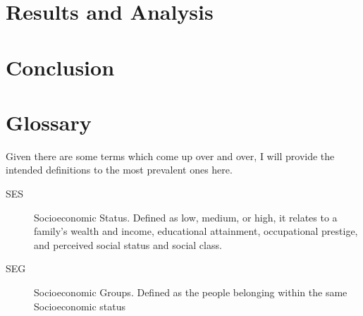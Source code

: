 \documentclass[fleqn,10pt]{olplainarticle}
\begin{document}
\section*{Results and Analysis}
\section*{Conclusion}
\section*{Glossary}
Given there are some terms which come up over and over, I will provide the intended definitions to the most prevalent ones here.

\begin{description}
\item[SES] Socioeconomic Status. Defined as low, medium, or high, it relates to a family's wealth and income, educational attainment, occupational prestige, and perceived social status and social class.\citep{sesdef}
\item[SEG] Socioeconomic Groups. Defined as the people belonging within the same Socioeconomic status
\end{description}



\end{document}
